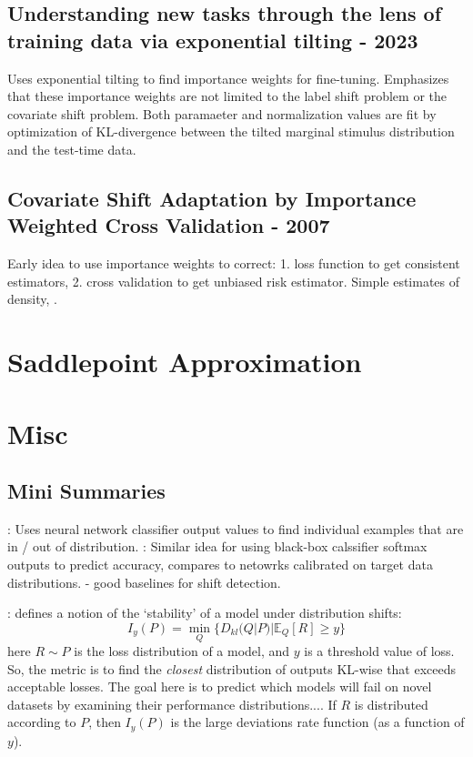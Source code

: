 \documentclass{article}[10pt]      %
\begin{document}
\subsection{Understanding new tasks through the lens of training data via exponential tilting - 2023 \cite{maity_understanding_2023}}
Uses exponential tilting to find importance weights for fine-tuning. Emphasizes that these importance weights are not limited to the label shift problem or the covariate shift problem. Both paramaeter and normalization values are fit by optimization of KL-divergence between the tilted marginal stimulus distribution and the test-time data.



\subsection{Covariate Shift Adaptation by Importance Weighted Cross Validation - 2007 \cite{sugiyama_covariate_2007}}
Early idea to use importance weights to correct: 1. loss function to get consistent estimators, 2. cross validation to get unbiased risk estimator.
Simple estimates of density, .



\section{Saddlepoint Approximation}






\section{Misc}
\subsection{Mini Summaries}
\cite{hendrycks_baseline_2017}: Uses neural network classifier output values to find individual examples that are in / out of distribution.
\cite{garg_leveraging_2022}: Similar idea for using black-box calssifier softmax outputs to predict accuracy, compares to netowrks calibrated on target data distributions. - good baselines for shift detection.


\cite{namkoong_minimax_2024}: defines a notion of the `stability' of a model under distribution shifts:
\begin{equation}
  I_y(P) = \min_Q \{D_{kl}(Q | P) | \mathbb{E}_Q[R] \ge y  \}
\end{equation}
here $R \sim P$ is the loss distribution of a model, and $y$ is a threshold value of loss.
So, the metric is to find the \textit{closest} distribution of outputs KL-wise that exceeds acceptable losses.
The goal here is to predict which models will fail on novel datasets by examining their performance distributions....
If $R$ is distributed according to $P$, then $I_y(P)$ is the large deviations rate function (as a function of $y$).
\end{document}
